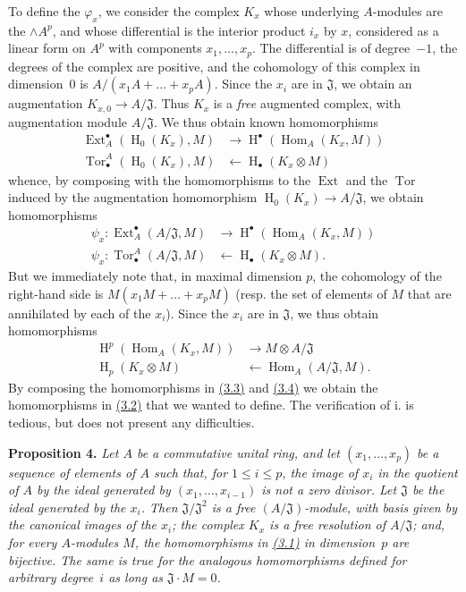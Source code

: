 \documentclass{article}
\newenvironment{itenv}[1]
  {\phantomsection\par\medskip\noindent\textbf{#1.}\itshape}
  {\par\medskip}
\newcommand{\from}{\leftarrow}
\renewcommand{\leq}{\leqslant}
\DeclareMathOperator{\Ext}{Ext}
\DeclareMathOperator{\Hom}{Hom}
\DeclareMathOperator{\Tor}{Tor}
\DeclareMathOperator{\HH}{H}
\newcommand{\oldpage}[1]{\marginpar{\footnotesize$\Big\vert$ \textit{p.~#1}}}
\begin{document}
To define the $\varphi_x$, we consider the complex $K_x$ whose underlying $A$-modules are the $\wedge A^p$, and whose differential is the interior product $i_x$ by $x$, considered as a linear form on $A^p$ with components $x_1,\ldots,x_p$.
The differential is of degree~$-1$, the degrees of the complex are positive, and the cohomology of this complex in dimension~$0$ is $A/(x_1A+\ldots+x_pA)$.
Since the $x_i$ are in $\mathfrak{J}$, we obtain an augmentation $K_{x,0}\to A/\mathfrak{J}$.
Thus $K_x$ is a \emph{free} augmented complex, with augmentation module $A/\mathfrak{J}$.
We thus obtain known homomorphisms
\[
  \begin{aligned}
    \Ext_A^\bullet(\HH_0(K_x),M) &\to \HH^\bullet(\Hom_A(K_x,M))
  \\\Tor_\bullet^A(\HH_0(K_x),M) &\from \HH_\bullet(K_x\otimes M)
  \end{aligned}
\]
whence, by composing with the homomorphisms to the $\Ext$ and the $\Tor$ induced by the augmentation homomorphism $\HH_0(K_x)\to A/\mathfrak{J}$, we obtain homomorphisms
\[
\label{3.3}
  \begin{aligned}
    \psi_x\colon \Ext_A^\bullet(A/\mathfrak{J},M) &\to \HH^\bullet(\Hom_A(K_x,M))
  \\\psi_x\colon \Tor_\bullet^A(A/\mathfrak{J},M) &\from \HH_\bullet(K_x\otimes M).
  \end{aligned}
\tag{3.3}
\]
But we immediately note that, in maximal dimension $p$, the cohomology of the right-hand side is $M(x_1M+\ldots+x_pM)$ (resp. the set of elements of $M$ that are annihilated by each of the $x_i$).
Since the $x_i$ are in $\mathfrak{J}$, we thus obtain homomorphisms
\[
\label{3.4}
  \begin{aligned}
    \HH^p(\Hom_A(K_x,M)) &\to M\otimes A/\mathfrak{J}
  \\\HH_p(K_x\otimes M) &\from \Hom_A(A/\mathfrak{J},M).
  \end{aligned}
\tag{3.4}
\]
By composing the homomorphisms in \hyperref[3.3]{(3.3)} and \hyperref[3.4]{(3.4)} we obtain the homomorphisms in \hyperref[3.2]{(3.2)} that we wanted to define.
The verification of i. is tedious, but does not present any difficulties.

\oldpage{149-07}
\begin{itenv}{Proposition 4}
\label{proposition4}
  Let $A$ be a commutative unital ring, and let $(x_1,\ldots,x_p)$  be a sequence of elements of $A$ such that, for $1\leq i\leq p$, the image of $x_i$ in the quotient of $A$ by the ideal generated by $(x_1,\ldots,x_{i-1})$ is not a zero divisor.
  Let $\mathfrak{J}$ be the ideal generated by the $x_i$.
  Then $\mathfrak{J}/\mathfrak{J}^2$ is a free $(A/\mathfrak{J})$-module, with basis given by the canonical images of the $x_i$;
  the complex $K_x$ is a free resolution of $A/\mathfrak{J}$;
  and, for every $A$-modules $M$, the homomorphisms in \hyperref[3.1]{(3.1)} in dimension~$p$ are bijective.
  The same is true for the analogous homomorphisms defined for arbitrary degree~$i$ as long as $\mathfrak{J}\cdot M=0$.
\end{itenv}
\end{document}
